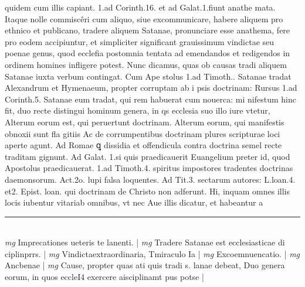 \documentclass{article}
\begin{document}
\begin{pages}
quidem cum illis capiant. 1.ad Corinth.16. et ad Galat.1.fiunt anathe mata. Itaque  nolle commiscêri cum aliquo, siue excommunicare, habere aliquem pro ethnico et publicano, tradere aliquem Satanae, pronunciare esse anathema, fere pro eodem accipiuntur, et simpliciter significant grauissimum vindictae seu poenae genus, quod ecclefia postomnia tentata ad emendandos et redigendos in ordinem homines infligere potest.  \pend\pstart Nunc dicamus, quas ob causas tradi aliquem Satanae iuxta verbum contingat. Cum Ape stolus 1.ad Timoth.. Satanae tradat Alexandrum et Hymenaeum, propter corruptam ab i psis doctrinam: Rursus 1.ad Corinth.5. Satanae eum tradat, qui rem habuerat cum nouerca: mi nifestum hinc fit, duo recte distingui hominum genera, in qs ecclesia suo illo iure vtetur, Alterum eorum est, qui peruertunt doctrinam. Alterum eorum, qui manifestis obnoxii sunt fla gitiis Ac de corrumpentibus  doctrinam plures scripturae loci aperte agunt. Ad Romae ꝗ dissidia et offendicula contra doctrina semel recte traditam gignunt. Ad Galat. 1.si quis praedicauerit Euangelium preter id, quod Apostolus praedicauerat. 1.ad Timoth.4. spiritus impostores tradentes doctrinas daemonsorum. Act.2o. lupi falsa loquentes. Ad Tit.3. sectarum autores: L.loan.4. et2. Epist. loan. qui doctrinam de Christo non adferunt. Hi, inquam omnes illis locis iubentur vitariab omnibus, vt nec Aue illis dicatur, et habeantur a\pend
\vspace{0.5cm}\noindent
\vspace{0.2cm}\rule{1cm}{0.2pt}\\ 
\hspace{0.2cm}\textit{mg}
\footnotesize Imprecationes ueteris te lanenti. 
\normalsize| 
\hspace{0.2cm}\textit{mg}
\footnotesize Tradere Satanae est ecclesiasticae di ciplinprrs. 
\normalsize| 
\hspace{0.2cm}\textit{mg}
\footnotesize Vindictaextraordinaria, Tmiraculo Ia 
\normalsize| 
\hspace{0.2cm}\textit{mg}
\footnotesize Excoemnuencatio. 
\normalsize| 
\hspace{0.2cm}\textit{mg}
\footnotesize Ancbenae 
\normalsize| 
\hspace{0.2cm}\textit{mg}
\footnotesize Cause, propter quas ati quis tradi s. lanae debeat, Duo genera eorum, in quos eccleI4 exercere aisciplinamt pus potse 
\normalsize| 

\end{pages}
\end{document}
